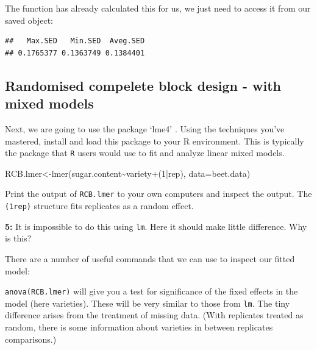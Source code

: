 \documentclass[
]{book}
\makeatletter
\newenvironment{Shaded}{\begin{snugshade}}{\end{snugshade}}
\newcommand{\AttributeTok}[1]{\textcolor[rgb]{0.77,0.63,0.00}{#1}}
\newcommand{\DecValTok}[1]{\textcolor[rgb]{0.00,0.00,0.81}{#1}}
\newcommand{\FunctionTok}[1]{\textcolor[rgb]{0.00,0.00,0.00}{#1}}
\newcommand{\NormalTok}[1]{#1}
\newcommand{\OtherTok}[1]{\textcolor[rgb]{0.56,0.35,0.01}{#1}}
\newcommand{\SpecialCharTok}[1]{\textcolor[rgb]{0.00,0.00,0.00}{#1}}
\newcommand{\StringTok}[1]{\textcolor[rgb]{0.31,0.60,0.02}{#1}}
\newenvironment{kframe}{%
\medskip{}
\setlength{\fboxsep}{.8em}
 \def\at@end@of@kframe{}%
 \ifinner\ifhmode%
  \def\at@end@of@kframe{\end{minipage}}%
  \begin{minipage}{\columnwidth}%
 \fi\fi%
 \def\FrameCommand##1{\hskip\@totalleftmargin \hskip-\fboxsep
 \colorbox{shadecolor}{##1}\hskip-\fboxsep
     \hskip-\linewidth \hskip-\@totalleftmargin \hskip\columnwidth}%
 \MakeFramed {\advance\hsize-\width
   \@totalleftmargin\z@ \linewidth\hsize
   \@setminipage}}%
 {\par\unskip\endMakeFramed%
 \at@end@of@kframe}
\newenvironment{rmdblock}[1]
  {
  \begin{itemize}
  \renewcommand{\labelitemi}{
    \raisebox{-.7\height}[0pt][0pt]{
      {\setkeys{Gin}{width=3em,keepaspectratio}\texttt{[image: images/\#1]}}
    }
  }
  \setlength{\fboxsep}{1em}
  \begin{kframe}
  \item
  }
  {
  \end{kframe}
  \end{itemize}
  }
\newenvironment{rmdquiz}
  {\begin{rmdblock}{quiz}}
  {\end{rmdblock}}
\makeatother
\begin{document}
The function has already calculated this for us, we just need to access it from our saved object:

\begin{Shaded}
\end{Shaded}

\begin{verbatim}
##   Max.SED   Min.SED  Aveg.SED 
## 0.1765377 0.1363749 0.1384401
\end{verbatim}

\hypertarget{randomised-compelete-block-design---with-mixed-models}{%
\subsection{Randomised compelete block design - with mixed models}\label{randomised-compelete-block-design---with-mixed-models}}

Next, we are going to use the package `lme4' \citep{R-lme4}. Using the techniques you've mastered, install and load this package to your R environment. This is typically the package that \texttt{R} users would use to fit and analyze linear mixed models.

\begin{Shaded}
\begin{Highlighting}[]
\NormalTok{RCB.lmer}\OtherTok{\textless{}{-}}\FunctionTok{lmer}\NormalTok{(sugar.content}\SpecialCharTok{\textasciitilde{}}\NormalTok{variety}\SpecialCharTok{+}\NormalTok{(}\DecValTok{1}\SpecialCharTok{|}\NormalTok{rep), }\AttributeTok{data=}\NormalTok{beet.data)}
\end{Highlighting}
\end{Shaded}

Print the output of \texttt{RCB.lmer} to your own computers and inspect the output. The \texttt{(1\textbar{}rep)} structure fits replicates as a random effect.

\begin{rmdquiz}
\textbf{5:}
It is impossible to do this using \texttt{lm}. Here it should make little difference. Why is this?
\end{rmdquiz}

There are a number of useful commands that we can use to inspect our fitted model:

\texttt{anova(RCB.lmer)} will give you a test for significance of the fixed effects in the model (here varieties). These will be very similar to those from \texttt{lm}. The tiny difference arises from the treatment of missing data. (With replicates treated as random, there is some information about varieties in between replicates comparisons.)
\end{document}
